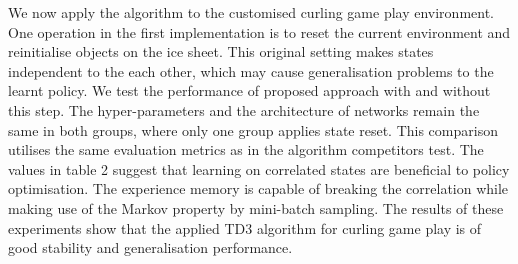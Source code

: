 \documentclass[oneside,11pt,a4paper]{article}
\begin{document}
\newline
\newline
\noindent
We now apply the algorithm to the customised curling game play environment. One operation in the first implementation is to reset the current environment and reinitialise objects on the ice sheet. This original setting makes states independent to the each other, which may cause generalisation problems to the learnt policy. We test the performance of proposed approach with and without this step. The hyper-parameters and the architecture of networks remain the same in both groups, where only one group applies state reset. This comparison utilises the same evaluation metrics as in the algorithm competitors test. The values in table 2 suggest that learning on correlated states are beneficial to policy optimisation. The experience memory is capable of breaking the correlation while making use of the Markov property by mini-batch sampling.
\newline
\newline
\noindent
The results of these experiments show that the applied TD3 algorithm for curling game play is of good stability and generalisation performance.



\newpage
\end{document}
